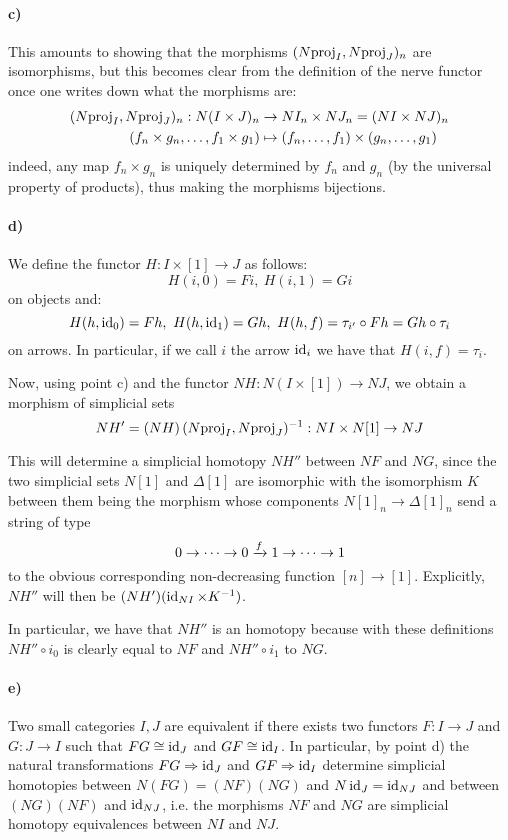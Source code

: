 \documentclass[a4paper,11pt,english]{article}
\begin{document}
\begin{exercise}[3]
\paragraph{c)} This amounts to showing that the morphisms $(N\!\operatorname{proj}_I,N\!\operatorname{proj}_J)_n$ are isomorphisms, but this becomes clear from the definition of the nerve functor once one writes down what the morphisms are:
\begin{align*}
(N\!\operatorname{proj}_I,N\!\operatorname{proj}_J)_n:N(I\times J)_n&\to NI_n\times NJ_n=(NI\times NJ)_n \\
(f_n\times g_n,\dots,f_1\times g_1)&\mapsto (f_n,\dots,f_1)\times(g_n,\dots,g_1)
\end{align*}
indeed, any map $f_n\times g_n$ is uniquely determined by $f_n$ and $g_n$ (by the universal property of products), thus making the morphisms bijections.

\paragraph{d)} We define the functor $H:I\times[1]\to J$ as follows:
\[H(i,0)=Fi,\ H(i,1)=Gi\]
on objects and:
\[H(h,\id_0)=Fh,\ H(h,\id_1)=Gh,\ H(h,f)=\tau_{i'}\circ Fh=Gh\circ \tau_i\]
on arrows. In particular, if we call $i$ the arrow $\operatorname{id}_i$ we have that $H(i,f)=\tau_i$.

Now, using point c) and the functor $NH:N(I\times[1])\to NJ$, we obtain a morphism of simplicial sets 
\[NH'=(NH)\,(N\!\operatorname{proj}_I,N\!\operatorname{proj}_J)^{-1}:NI\times N[1]\to NJ\]

This will determine a simplicial homotopy $NH''$ between $NF$ and $NG$, since the two simplicial sets $N[1]$ and $\Delta[1]$ are isomorphic with the isomorphism $K$ between them being the morphism whose components $N[1]_n\to\Delta[1]_n$ send a string of type \[0 \to \dots \to 0 \xrightarrow{f} 1 \to \dots \to 1\]
to the obvious corresponding non-decreasing function $[n]\to[1]$. Explicitly, $NH''$ will then be $(NH')(\operatorname{id}_{NI}\times K^{-1})$.

In particular, we have that $NH''$ is an homotopy because with these definitions $NH''\circ i_0$ is clearly equal to $NF$ and $NH''\circ i_1$ to $NG$.

\paragraph{e)} Two small categories $I,J$ are equivalent if there exists two functors $F:I\to J$ and $G:J\to I$ such that $FG\cong\operatorname{id}_J$ and $GF\cong\operatorname{id}_I$. In particular, by point d) the natural transformations $FG\Rightarrow\operatorname{id}_J$ and $GF\Rightarrow\operatorname{id}_I$ determine simplicial homotopies between $N(FG)=(NF)(NG)$ and $N\operatorname{id}_J=\operatorname{id}_{NJ}$ and between $(NG)(NF)$ and $\operatorname{id}_{NJ}$, i.e. the morphisms $NF$ and $NG$ are simplicial homotopy equivalences between $NI$ and $NJ$.

\end{exercise}
\end{document}
